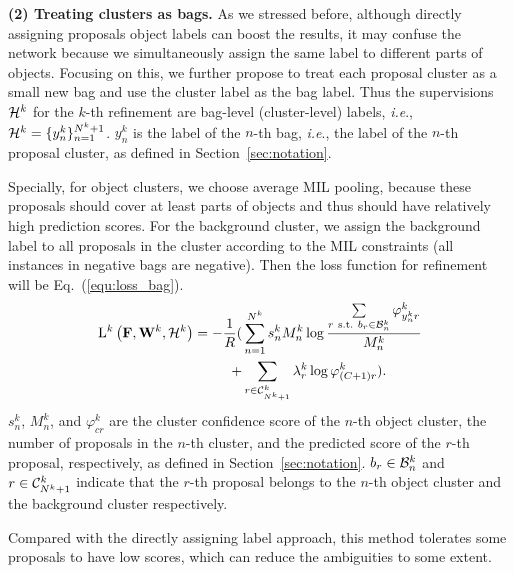 \documentclass[10pt,journal,compsoc]{IEEEtran}
\def\ie{\emph{i.e}.} \def\Ie{\emph{I.e}.}
\begin{document}
\vspace{0.1cm}
\noindent\textbf{(2) Treating clusters as bags.}
As we stressed before,
although directly assigning proposals object labels can boost the results,
it may confuse the network because we simultaneously assign the same label to different parts of objects.
Focusing on this,
we further propose to treat each proposal cluster as a small new bag and use the cluster label as the bag label.
Thus the supervisions ${\cal H}^{k}$ for the $k$-th refinement are bag-level (cluster-level) labels,
\ie, ${\cal H}^{k} = \{y^{k}_{n}\}_{n=1}^{N^{k}+1}$.
$y^{k}_{n}$ is the label of the $n$-th bag, \ie, the label of the $n$-th proposal cluster,
as defined in Section~\ref{sec:notation}.

Specially, for object clusters,
we choose average MIL pooling,
because these proposals should cover at least parts of objects and thus should have relatively high prediction scores.
For the background cluster,
we assign the background label to all proposals in the cluster according to the MIL constraints
(all instances in negative bags are negative).
Then the loss function for refinement will be Eq.~(\ref{equ:loss_bag}).
\begin{equation}
\label{equ:loss_bag}
\begin{aligned}
   \mathrm{L}^{k}\left(\mathbf{F}, \mathbf{W}^{k}, {\cal H}^{k}\right) = -\frac{1}{R} (&\mathop{\sum} \limits_{n=1}^{N^{k}} s^{k}_{n} M_{n}^{k} \log \frac{\mathop{\sum} \limits_{r \ \textup{s.t.}\ b_{r} \in {\cal B}^{k}_{n}} \varphi^{k}_{y^{k}_{n}r}}{M_{n}^{k}}\\
   + &\mathop{\sum} \limits_{r \in {\cal C}^{k}_{N^{k} + 1}} \lambda^{k}_{r} \log \varphi^{k}_{(C+1)r}).
\end{aligned}
\end{equation}
$s^{k}_{n}$, $M_{n}^{k}$, and $\varphi^{k}_{cr}$ are the cluster confidence score of the $n$-th object cluster,
the number of proposals in the $n$-th cluster,
and the predicted score of the $r$-th proposal,
respectively,
as defined in Section~\ref{sec:notation}.
$b_{r} \in {\cal B}^{k}_{n}$ and $r \in {\cal C}^{k}_{N^{k}+1}$ indicate that
the $r$-th proposal belongs to the $n$-th object cluster
and the background cluster respectively.

Compared with the directly assigning label approach,
this method tolerates some proposals to have low scores, which can reduce the ambiguities to some extent.
\end{document}
